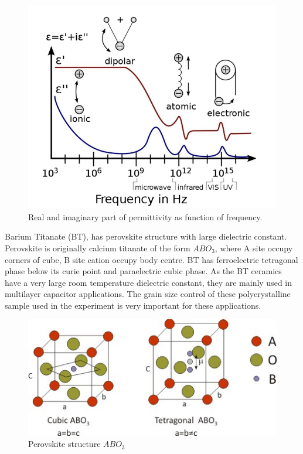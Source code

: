 \documentclass[a4paper, amsfonts, amssymb, amsmath, reprint, showkeys, nofootinbib, twoside]{revtex4-1}
\begin{document}
\begin{figure}[H]
	\centering
	\includegraphics[scale=0.34]{1}
	\caption{Real and imaginary part of permittivity as function of frequency. }
	\label{1}
\end{figure}

Barium Titanate (BT), has perovskite structure with large dielectric constant. Perovskite is originally calcium titanate of the form $ABO_3$, where A site occupy corners of cube, B site cation occupy body centre. BT has ferroelectric tetragonal phase below its curie point and paraelectric cubic phase. As the BT ceramics have a very large room temperature dielectric constant, they are mainly
used in multilayer capacitor applications. The grain size control of these polycrystalline sample
used in the experiment is very important for these applications.  

\begin{figure}[H]
	\centering
	\includegraphics[scale=2.2]{2}
	\caption{Perovskite structure $ABO_3$ }
	\label{1}
\end{figure}
\end{document}
